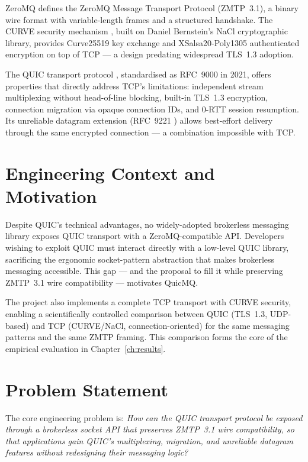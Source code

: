 \documentclass[12pt, a4paper, oneside]{report}
\begin{document}
ZeroMQ defines the ZeroMQ Message Transport Protocol (ZMTP~3.1), a binary wire format with variable-length frames and a structured handshake. The CURVE security mechanism \cite{zmq}, built on Daniel Bernstein's NaCl cryptographic library, provides Curve25519 key exchange and XSalsa20-Poly1305 authenticated encryption on top of TCP — a design predating widespread TLS~1.3 adoption.

The QUIC transport protocol \cite{rfc9000}, standardised as RFC~9000 in 2021, offers properties that directly address TCP's limitations: independent stream multiplexing without head-of-line blocking, built-in TLS~1.3 encryption, connection migration via opaque connection IDs, and 0-RTT session resumption. Its unreliable datagram extension (RFC~9221 \cite{rfc9221}) allows best-effort delivery through the same encrypted connection — a combination impossible with TCP.

\section{Engineering Context and Motivation}
\label{sec:motivation}

Despite QUIC's technical advantages, no widely-adopted brokerless messaging library exposes QUIC transport with a ZeroMQ-compatible API. Developers wishing to exploit QUIC must interact directly with a low-level QUIC library, sacrificing the ergonomic socket-pattern abstraction that makes brokerless messaging accessible. This gap — and the proposal to fill it while preserving ZMTP~3.1 wire compatibility — motivates QuicMQ.

The project also implements a complete TCP transport with CURVE security, enabling a scientifically controlled comparison between QUIC (TLS~1.3, UDP-based) and TCP (CURVE/NaCl, connection-oriented) for the same messaging patterns and the same ZMTP framing. This comparison forms the core of the empirical evaluation in Chapter~\ref{ch:results}.

\section{Problem Statement}
\label{sec:problem}

The core engineering problem is: \textit{How can the QUIC transport protocol be exposed through a brokerless socket API that preserves ZMTP~3.1 wire compatibility, so that applications gain QUIC's multiplexing, migration, and unreliable datagram features without redesigning their messaging logic?}
\end{document}
